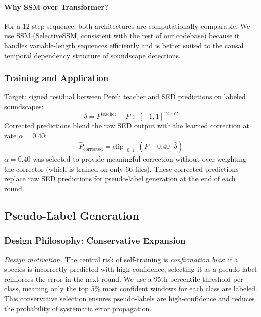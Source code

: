 \documentclass[journal]{IEEEtran}
\begin{document}
\paragraph{Why SSM over Transformer?}
For a 12-step sequence, both architectures are computationally comparable.
We use SSM (SelectiveSSM, consistent with the rest of our codebase) because it handles variable-length sequences efficiently and is better suited to the causal temporal dependency structure of soundscape detections.

\subsubsection{Training and Application}

Target: signed residual between Perch teacher and SED predictions on labeled soundscapes:
\begin{equation}
  \delta = P^\text{teacher} - P \in [-1,1]^{12 \times C}
\end{equation}
Corrected predictions blend the raw SED output with the learned correction at rate $\alpha=0.40$:
\begin{equation}
  \hat{P}_\text{corrected} = \mathrm{clip}_{[0,1]}\!\left(P + 0.40 \cdot \hat{\delta}\right)
\end{equation}
$\alpha=0.40$ was selected to provide meaningful correction without over-weighting the corrector (which is trained on only 66 files).
These corrected predictions replace raw SED predictions for pseudo-label generation at the end of each round.

\subsection{Pseudo-Label Generation}

\subsubsection{Design Philosophy: Conservative Expansion}

\emph{Design motivation.}
The central risk of self-training is \emph{confirmation bias}: if a species is incorrectly predicted with high confidence, selecting it as a pseudo-label reinforces the error in the next round.
We use a 95th percentile threshold per class, meaning only the top 5\% most confident windows for each class are labeled.
This conservative selection ensures pseudo-labels are high-confidence and reduces the probability of systematic error propagation.
\end{document}
